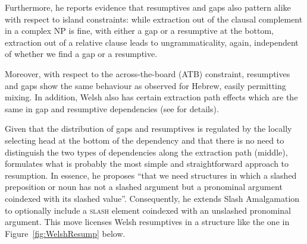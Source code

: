 \documentclass[output=paper
	        ,collection
	        ,collectionchapter
 	        ,biblatex
                ,babelshorthands
                ,newtxmath
                ,draftmode
                ,colorlinks, citecolor=brown
]{langscibook}
\begin{document}
{Furthermore, he reports evidence that resumptives and gaps also
pattern alike with respect to island constraints: while extraction out
of the clausal complement in a complex NP is fine, with either a gap
or a resumptive at the bottom, extraction out of a relative clause leads to
ungrammaticality, again, independent of whether we find a gap or a
resumptive.

\begin{exe}
\end{exe}

\noindent
Moreover, with respect to the across-the-board (ATB) constraint,
resumptives and gaps show the same behaviour as observed for Hebrew,
easily permitting mixing. In addition, Welsh also has certain
extraction path effects which are the same in gap and resumptive
dependencies (see \citealp{Borsley:10} for details).

Given that the distribution of gaps and resumptives is regulated by
the locally selecting head at the bottom of the dependency and that
there is no need to distinguish the two types of dependencies along
the extraction path (middle), \citet[97]{Borsley:10} formulates what is
probably the most simple and straightforward approach to
resumption. In essence, he proposes ``that we need structures in which
a slashed preposition or noun has not a slashed argument but a
pronominal argument coindexed with its slashed value''. Consequently,
he extends Slash Amalgamation to optionally include a
\textsc{slash} element coindexed with an unslashed pronominal
argument. This move licenses Welsh resumptives in a structure like the
one in Figure~\ref{fig:WelshResump} below.

}
\end{document}
